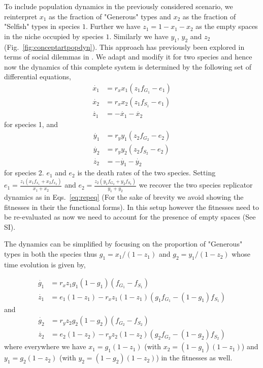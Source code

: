\documentclass[12pt]{article}
\begin{document}
To include population dynamics in the previously considered scenario, we reinterpret $x_1$ as the fraction of "Generous" types and $x_2$ as the fraction of "Selfish" types in species $1$. Further we have $z_1 = 1 - x_1 - x_2$ as the empty spaces in the niche occupied by species $1$. Similarly we have $y_1$, $y_2$ and $z_2$ (Fig.~\ref{fig:conceptartpopdyn}). This approach has previously been explored in terms of social dilemmas in \citep{hauert:PRSB:2006}. 
We adapt and modify it for two species and hence now the dynamics of this complete system is determined by the following set of differential equations,
%
\begin{align}
	\dot{x_1} &= r_x x_1 (z_1 f_{G_1} - e_1)  \\
	\dot{x_2} &= r_x x_2 (z_1 f_{S_1} - e_1) \\
	\dot{z_1} &= - \dot{x_1} - \dot{x_2} 
\end{align}
%
for species 1, and
%
\begin{align}
	\dot{y_1} &= r_y y_1 (z_2 f_{G_2} - e_2)  \\
	\dot{y_2} &= r_y y_2 (z_2 f_{S_2} - e_2) \\
	\dot{z_2} &= - \dot{y_1} - \dot{y_2} 
\end{align}
%
for species 2.  $e_1$ and $e_2$ is the death rates of the two species. Setting $e_1 = \frac{z_1 (x_1 f_{x_1} + x_2 f_{x_2}) }{x_1 + x_2}$ and $e_2 = \frac{z_2 (y_1 f_{G_2} + y_2 f_{S_2}) }{y_1 + y_2}$ we recover the two species replicator dynamics as in Eqs.~\ref{eq:repeq} (For the sake of brevity we avoid showing the fitnesses in their the functional forms). In this setup however the fitnesses need to be re-evaluated as now we need to account for the presence of empty spaces (See SI).

The dynamics can be simplified by focusing on the proportion of "Generous" types in both the species thus $g_1 = x_1/(1-z_1)$ and $g_2 = y_1/(1-z_2)$ whose time evolution is given by,

\begin{align}
	\dot{g_1} &= r_x z_1 g_1 (1-g_1) (f_{G_1} - f_{S_1})  \\
	\dot{z_1} &= e_1 (1-z_1) - r_x z_1 (1-z_1) (g_1 f_{G_1} -  (1-g_1) f_{S_1})
\end{align}
and
\begin{align}
	\dot{g_2} &= r_y z_2 g_2 (1-g_2) (f_{G_2} - f_{S_2})  \\
	\dot{z_2} &= e_2 (1-z_2) - r_y z_2 (1-z_2) (g_2 f_{G_2} -  (1-g_2) f_{S_2})
\end{align}
%
where everywhere we have $x_1 = g_1 (1-z_1)$ (with $x_2 = (1-g_1) (1-z_1)$) and $y_1 = g_2 (1-z_2)$ (with $y_2 = (1-g_2) (1-z_2)$) in the fitnesses as well.
\end{document}
